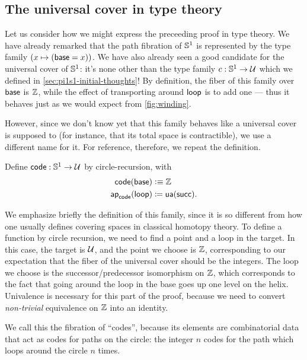 \subsection{The universal cover in type theory}
\label{sec:pi1s1-universal-cover}

Let us consider how we might express the preceeding proof in type theory.
We have already remarked that the path fibration of $\mathbb{S}^1$ is represented by the type family $(x\mapsto (\mathsf{base}=x))$.
We have also already seen a good candidate for the universal cover of $\mathbb{S}^1$: it's none other than the type family $c:\mathbb{S}^1\to\mathcal{U}$ which we defined in \autoref{sec:pi1s1-initial-thoughts}!
By definition, the fiber of this family over $\mathsf{base}$ is $\mathbb{Z}$, while the effect of transporting around $\mathsf{loop}$ is to add one --- thus it behaves just as we would expect from \autoref{fig:winding}.

However, since we don't know yet that this family behaves like a universal cover is supposed to (for instance, that its total space is contractible), we use a different name for it.
For reference, therefore, we repeat the definition.

\begin{defn} \label{S1-universal-cover}
  Define $\mathsf{code} : \mathbb{S} ^1 \to \mathcal{U}$ by circle-recursion, with 
  \begin{align*}
    \mathsf{code}(\mathsf{base}) &\vcentcolon\equiv \mathbb{Z} \\
    \mathsf{ap}_{\mathsf{code}}({\mathsf{loop}}) &\coloneqq \mathsf{ua}(\mathsf{succ}).
  \end{align*}
\end{defn}

We emphasize briefly the definition of this family, since it is so different from how one usually defines covering spaces in classical homotopy theory.
To define a function by circle recursion, we need to find a point and a
loop in the target.  In this case, the target is $\mathcal{U}$, and the point
we choose is $\mathbb{Z}$, corresponding to our expectation that the
fiber of the universal cover should be the integers.  The loop we choose
is the successor/predecessor isomorphism on $\mathbb{Z}$, which
corresponds to the fact that going around the loop in the base goes up
one level on the helix.  Univalence is necessary for this part of the
proof, because we need to convert \emph{non-trivial} equivalence on $\mathbb{Z}$ into an identity.  

We call this the fibration of ``codes'', because its elements are combinatorial data that act as codes for paths on the circle: the integer $n$ codes for the path which loops around the circle $n$ times.

